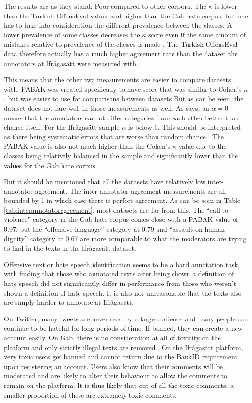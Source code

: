 \documentclass[nofilelist]{cslthse-msc}
\begin{document}
The results are as they stand: Poor compared to other corpora. The $\kappa$ is lower than the Turkish OffensEval values and higher than the Gab hate corpus, but one has to take into consideration the different prevalence between the classes. A lower prevalence of some classes decreases the $\kappa$ score even if the same amount of mistakes relative to prevalence of the classes is made \citep{byrt1993bias}. The Turkish OffensEval data therefore actually has a much higher agreement rate than the dataset the annotators at Ifrågasätt were measured with. 

This means that the other two measurements are easier to compare datasets with. PABAK was created specifically to have score that was similar to Cohen's $\kappa$, but was easier to use for comparisons between datasets \citep{byrt1993bias} But as can be seen, the dataset does not fare well in those measurements as well. As \citet{krippendorff2011computing} says, an $\alpha = 0$ means that the annotators cannot differ categories from each other better than chance itself. For the Ifrågasätt sample $\alpha$ is below  $0$. This should be interpreted as there being systematic errors that are worse than random chance \citep{krippendorff2011computing}. The PABAK value is also not much higher than the Cohen's $\kappa$ value due to the classes being relatively balanced in the sample and significantly lower than the values for the Gab hate corpus.

But it should be mentioned that all the datasets have relatively low inter-annotator agreement. The inter-annotator agreement measurements are all bounded by 1 in which case there is perfect agreement. As can be seen in Table \ref{tab:interannotatoragreement}, most datasets are far from this. The ``call to violence'' category in the Gab hate corpus comes close with a PABAK value of 0.97, but the ``offensive language'' category at 0.79 and 
``assault on human dignity'' category at 0.67 are more comparable to what the moderators are trying to find in the texts in the Ifrågasätt dataset. 

Offensive text or hate speech identification seems to be a hard annotation task, with \citet{DBLP:journals/corr/RossRCCKW17} finding that those who annotated texts after being shown a definition of hate speech did not significantly differ in performance from those who weren't shown a definition of hate speech. It is also not unreasonable that the texts also are simply harder to annotate at Ifrågasätt. 

On Twitter, many tweets are never read by a large audience and many people can continue to be hateful for long periods of time. If banned, they can create a new account easily. On Gab, there is no consideration at all of toxicity on the platform and only strictly illegal texts are removed \citep{gabracism}. On the Ifrågasätt platform, very toxic users get banned and cannot return due to the BankID requirement upon registering an account. Users also know that their comments will be moderated and are likely to alter their behaviour to allow the comments to remain on the platform. It is thus likely that out of all the toxic comments, a smaller proportion of these are extremely toxic comments.
\end{document}
